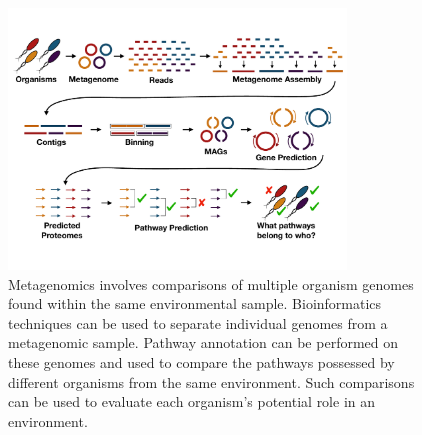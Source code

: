 \begin{figure}[!ht]
  \centering
	\includegraphics[width=0.8\textwidth]{media/metagenomics.pdf}
	 \caption{Metagenomics involves comparisons of multiple organism genomes found within the same environmental sample. Bioinformatics techniques can be used to separate individual genomes from a metagenomic sample. Pathway annotation can be performed on these genomes and used to compare the pathways possessed by different organisms from the same environment. Such comparisons can be used to evaluate each organism's potential role in an environment.}
	 \label{fig:metagenomics}
\end{figure}

